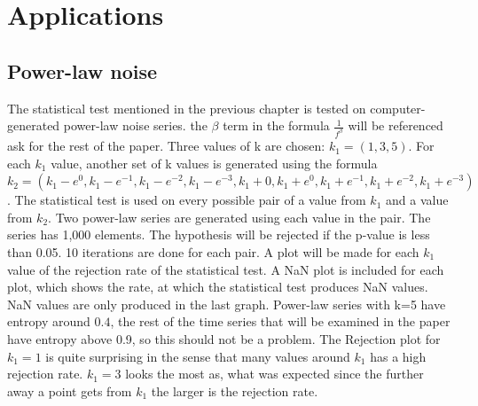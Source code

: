 \chapter{Applications}

\section{Power-law noise}

The statistical test mentioned in the previous chapter is tested on computer-generated power-law noise series.\cite{Timmer1995} the $\beta$ term in the formula $\frac{1}{f^{\beta}}$ will be referenced ask for the rest of the paper. Three values of k are chosen: $k_1=(1,3,5)$. For each $k_1$ value, another set of k values is generated using the formula $k_2=(k_1-e^0,k_1-e^{-1},k_1-e^{-2},k_1-e^{-3},k_1+0,k_1+e^0,k_1+e^{-1},k_1+e^{-2},k_1+e^{-3})$. The statistical test is used on every possible pair of a value from $k_1$ and a value from $k_2$. Two power-law series are generated using each value in the pair. The series has 1,000 elements. The hypothesis will be rejected if the p-value is less than 0.05. 10 iterations are done for each pair. A plot will be made for each $k_1$ value of the rejection rate of the statistical test. A NaN plot is included for each plot, which shows the rate, at which the statistical test produces NaN values. NaN values are only produced in the last graph. Power-law series with k=5 have entropy around $0.4$, the rest of the time series that will be examined in the paper have entropy above 0.9, so this should not be a problem. The Rejection plot for $k_1=1$ is quite surprising in the sense that many values around $k_1$ has a high rejection rate. $k_1=3$ looks the most as, what was expected since the further away a point gets from $k_1$ the larger is the rejection rate.



